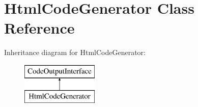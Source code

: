 \hypertarget{class_html_code_generator}{}\section{Html\+Code\+Generator Class Reference}
\label{class_html_code_generator}
Inheritance diagram for Html\+Code\+Generator\+:\begin{figure}[H]
\begin{center}
\leavevmode
\includegraphics[height=2.000000cm]{class_html_code_generator}
\end{center}
\end{figure}
